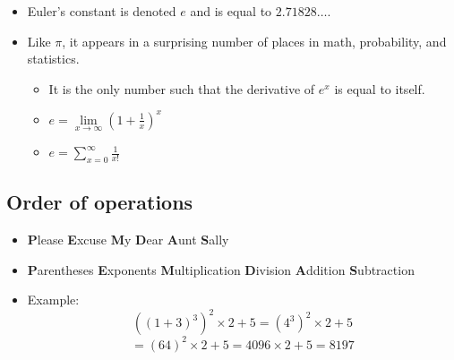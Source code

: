 \documentclass[12pt]{extarticle}
\newcommand{\bi}{\begin{itemize}}
\newcommand{\ei}{\end{itemize}}
\newcommand{\llim}{\lim\limits}
\begin{document}
\bi
\item Euler's constant is denoted $e$ and is equal to
  $2.71828\ldots$.
\item Like $\pi$, it appears in a surprising number of places in math,
  probability, and statistics.
\bi
\item It is the only number such that the derivative of $e^x$ is equal
  to itself.
\item $e = \llim_{x\to \infty} (1+\frac{1}{x})^x$
\item $e = \sum_{x=0}^\infty\frac{1}{x!}$
\ei
\ei

\subsection{Order of operations}
\bi
\item \textbf{P}lease \textbf{E}xcuse \textbf{M}y \textbf{D}ear \textbf{A}unt \textbf{S}ally 
\item \textbf{P}arentheses \textbf{E}xponents \textbf{M}ultiplication
  \textbf{D}ivision \textbf{A}ddition \textbf{S}ubtraction
\item Example:  $$((1+3)^3)^2 \times 2 + 5 = (4^3)^2 \times 2 + 5$$
$$ =  (64)^2 \times 2 + 5 = 4096  \times 2 + 5 = 8197$$
\ei
\end{document}
